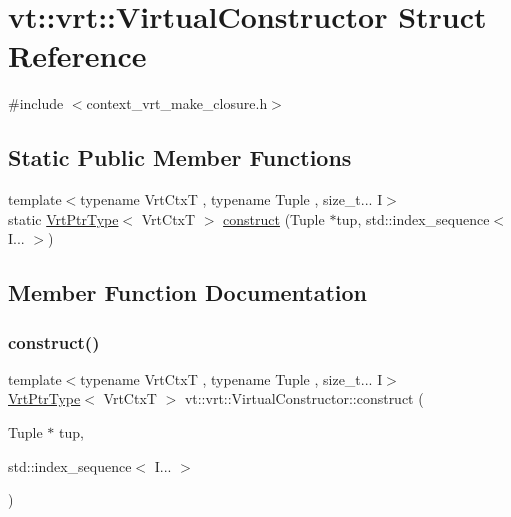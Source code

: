 \hypertarget{structvt_1_1vrt_1_1_virtual_constructor}{}\section{vt\+:\+:vrt\+:\+:Virtual\+Constructor Struct Reference}
\label{structvt_1_1vrt_1_1_virtual_constructor}


{\ttfamily \#include $<$context\+\_\+vrt\+\_\+make\+\_\+closure.\+h$>$}

\subsection*{Static Public Member Functions}
\begin{DoxyCompactItemize}
\item 
{\footnotesize template$<$typename Vrt\+CtxT , typename Tuple , size\+\_\+t... I$>$ }\\static \hyperlink{namespacevt_1_1vrt_a5567b830b7fd81a29e7d3593511721b9}{Vrt\+Ptr\+Type}$<$ Vrt\+CtxT $>$ \hyperlink{structvt_1_1vrt_1_1_virtual_constructor_a36a1aed1122a611a317a2252428a70d8}{construct} (Tuple $\ast$tup, std\+::index\+\_\+sequence$<$ I... $>$)
\end{DoxyCompactItemize}


\subsection{Member Function Documentation}
\mbox{\label{structvt_1_1vrt_1_1_virtual_constructor_a36a1aed1122a611a317a2252428a70d8}} 
\subsubsection{\texorpdfstring{construct()}{construct()}}
{\footnotesize\ttfamily template$<$typename Vrt\+CtxT , typename Tuple , size\+\_\+t... I$>$ \\
\hyperlink{namespacevt_1_1vrt_a5567b830b7fd81a29e7d3593511721b9}{Vrt\+Ptr\+Type}$<$ Vrt\+CtxT $>$ vt\+::vrt\+::\+Virtual\+Constructor\+::construct (\begin{DoxyParamCaption}\item[{Tuple $\ast$}]{tup,  }\item[{std\+::index\+\_\+sequence$<$ I... $>$}]{ }\end{DoxyParamCaption})\hspace{0.3cm}{\ttfamily [static]}}




